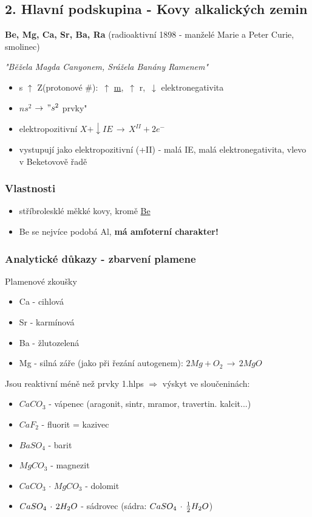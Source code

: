 \newpage
\subsection{2. Hlavní podskupina - Kovy alkalických zemin}
    \textbf{Be, Mg, Ca, Sr, Ba, Ra} (radioaktivní 1898 - manželé Marie a Peter Curie, smolinec)

    \textit{"Běžela Magda Canyonem, Srážela Banány Ramenem"}

    \begin{itemize}
        \item s $\uparrow$ Z(protonové \#): $\,\uparrow$ \underline{m}, $\,\uparrow$ r, $\,\downarrow$ elektronegativita
        \item $ns^2$ \fbox{$\uparrow \downarrow$} $\rightarrow \," s^2$ prvky"
        \item elektropozitivní \(X + \downarrow IE \,\to\,X^{II} + 2e^-\)
        \item vystupují jako elektropozitivní (+II) - malá IE, malá elektronegativita, vlevo v Beketovově řadě
    \end{itemize}

    \subsubsection*{Vlastnosti}
        \begin{itemize}
            \item stříbrolesklé měkké kovy, kromě \underline{Be}
            \item Be se nejvíce podobá Al, \textbf{má amfoterní charakter!}
        \end{itemize}

    \subsubsection*{Analytické důkazy - zbarvení plamene}
        Plamenové zkoušky
        \begin{itemize}
            \item Ca - cihlová
            \item Sr - karmínová
            \item Ba - žlutozelená
            \item Mg - silná záře (jako při řezání autogenem):  $2Mg + O _2 \,\to\, 2MgO$
        \end{itemize}
    Jsou reaktivní méně než prvky 1.hlps $\Rightarrow$ výskyt ve sloučeninách:
        \begin{itemize}
            \item $CaCO_3$ - vápenec (aragonit, sintr, mramor, travertin. kalcit...)
            \item $CaF_2$ - fluorit = kazivec
            \item $BaSO _4$ - barit
            \item $MgCO_3$ - magnezit
            \item $CaCO_3 \, \cdot \, MgCO_3$ - dolomit
            \item $CaSO_4 \, \cdot \, 2H_2O$ - sádrovec (sádra: $CaSO_4 \,\cdot\, \frac{1}{2}H_2O$)
        \end{itemize}

